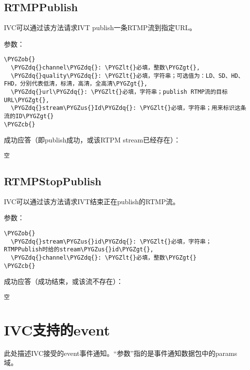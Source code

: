 \documentclass[letterpaper,10pt,english]{sphinxmanual}
\def\PYGZus{\char`\_}
\def\PYGZob{\char`\{}
\def\PYGZcb{\char`\}}
\def\PYGZlt{\char`\<}
\def\PYGZgt{\char`\>}
\def\PYGZdq{\char`\"}
\begin{document}
\subsection{RTMPPublish}
\label{rpc:rtmppublish}
IVC可以通过该方法请求IVT publish一条RTMP流到指定URL。

参数：

\begin{Verbatim}[commandchars=\\\{\}]
\PYGZob{}
  \PYGZdq{}channel\PYGZdq{}: \PYGZlt{}必填，整数\PYGZgt{},
  \PYGZdq{}quality\PYGZdq{}: \PYGZlt{}必填，字符串；可选值为：LD、SD、HD、FHD，分别代表低清，标清，高清，全高清\PYGZgt{},
  \PYGZdq{}url\PYGZdq{}: \PYGZlt{}必填，字符串；publish RTMP流的目标URL\PYGZgt{},
  \PYGZdq{}stream\PYGZus{}Id\PYGZdq{}: \PYGZlt{}必填，字符串；用来标识这条流的ID\PYGZgt{}
\PYGZcb{}
\end{Verbatim}

成功应答（即publish成功，或该RTPM stream已经存在）：

\begin{Verbatim}[commandchars=\\\{\}]
空
\end{Verbatim}


\subsection{RTMPStopPublish}
\label{rpc:rtmpstoppublish}
IVC可以通过该方法请求IVT结束正在publish的RTMP流。

参数：

\begin{Verbatim}[commandchars=\\\{\}]
\PYGZob{}
  \PYGZdq{}stream\PYGZus{}id\PYGZdq{}: \PYGZlt{}必填，字符串；RTMPPublish时给的stream\PYGZus{}id\PYGZgt{},
  \PYGZdq{}channel\PYGZdq{}: \PYGZlt{}必填，整数\PYGZgt{}
\PYGZcb{}
\end{Verbatim}

成功应答（成功结束，或该流不存在）：

\begin{Verbatim}[commandchars=\\\{\}]
空
\end{Verbatim}


\section{IVC支持的event}
\label{rpc:ivcevent}
此处描述IVC接受的event事件通知。“参数”指的是事件通知数据包中的params域。
\end{document}
